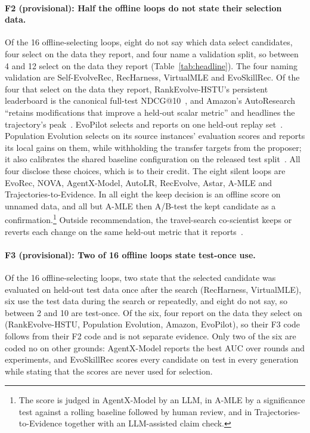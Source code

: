 \documentclass[sigconf,nonacm]{acmart}
\begin{document}
\paragraph{F2 (provisional): Half the offline loops do not state their selection data.} Of the 16
offline-selecting loops, eight do not say which data select candidates, four select on the data they report, and four name a validation split, so
between 4 and 12 select on the data they report (Table~\ref{tab:headline}). The four naming validation are Self-EvolveRec, RecHarness, VirtualMLE and EvoSkillRec. Of the four that select on the data they report, RankEvolve-HSTU's persistent leaderboard is the canonical full-test
NDCG@10~\cite{chen2026rankevolve}, and Amazon's AutoResearch ``retains modifications that improve a held-out scalar
metric'' and headlines the trajectory's peak~\cite{chandran2026autoresearch}. EvoPilot selects and reports on one
held-out replay set~\cite{fu2026evopilot}. Population Evolution selects on its source instances' evaluation scores
and reports its local gains on them, while withholding the transfer targets from the proposer; it also calibrates the
shared baseline configuration on the released test split~\cite{peng2026population}. All four disclose these choices,
which is to their credit. The eight silent loops are EvoRec, NOVA, AgentX-Model, AutoLR,
RecEvolve, Astar, A-MLE and Trajectories-to-Evidence. In all eight the keep decision is an offline score on unnamed
data, and all but A-MLE then A/B-test the
kept candidate as a confirmation.\footnote{The score is judged in AgentX-Model by an LLM, in A-MLE by a significance test against a rolling baseline followed by human
review, and in Trajectories-to-Evidence together with an LLM-assisted claim check.} Outside recommendation, the travel-search co-scientist keeps or
reverts each change on the same held-out metric that it reports~\cite{wu2026coscientist}.

\paragraph{F3 (provisional): Two of 16 offline loops state test-once use.} Of the 16 offline-selecting loops, two state that the selected
candidate was evaluated on held-out test data once after the search (RecHarness, VirtualMLE), six use the test data
during the search or repeatedly, and eight do not say, so between 2 and 10 are test-once. Of the six, four report on the data they select on (RankEvolve-HSTU, Population Evolution, Amazon, EvoPilot), so their F3 code follows from their F2 code and is not separate evidence. Only two of the six are coded no on other grounds:
AgentX-Model reports the best AUC over rounds and experiments, and EvoSkillRec scores every candidate on test in every
generation while stating that the scores are never used for selection.
\end{document}
